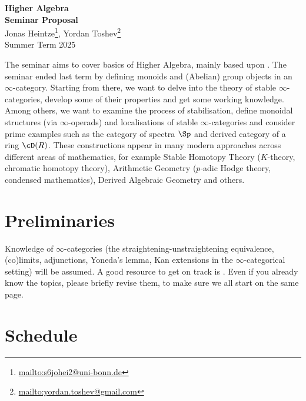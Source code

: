 \documentclass{article}
\begin{document}
\begin{center}
  \huge{\bf{Higher Algebra}}\vspace{5pt}
\\
\textbf{Seminar Proposal}\\
Jonas Heintze\footnote{\url{mailto:s6johei2@uni-bonn.de}}, Yordan Toshev\footnote{\url{mailto:yordan.toshev@gmail.com}}\\
Summer Term 2025
\end{center}




The seminar aims to cover basics of Higher Algebra, mainly based
upon \cite[Chapter II]{K-ThrNotes}.
The seminar ended last term by defining monoids and 
(Abelian) group objects in an $\infty$-category.
Starting from there, we want to delve into the
theory of stable $\infty$-categories, develop some
of their properties and get some working knowledge.
Among others, we want to examine the process of
stabilisation, define monoidal structures (via $\infty$-operads) 
and localisations 
of stable $\infty$-categories and consider prime examples such as
the category of spectra $\Sp$ and derived category of a 
ring $\cD(R)$.
These constructions appear in many modern approaches across different areas of 
mathematics,
for example
Stable Homotopy Theory ($K$-theory, chromatic homotopy theory),
Arithmetic Geometry ($p$-adic Hodge theory, condensed mathematics),
Derived Algebraic Geometry and others.


\section*{Preliminaries}
Knowledge of $\infty$-categories
(the straightening-unstraightening equivalence, (co)limits,
adjunctions, Yoneda's lemma, Kan extensions in the $\infty$-categorical
setting) will be assumed.
A good resource to get on track is \cite[Chapters 1-6]{infty-CatNotes}.
Even if you already know the topics, please briefly revise them,
to make sure we all start on the same page.


\section*{Schedule}
\end{document}
